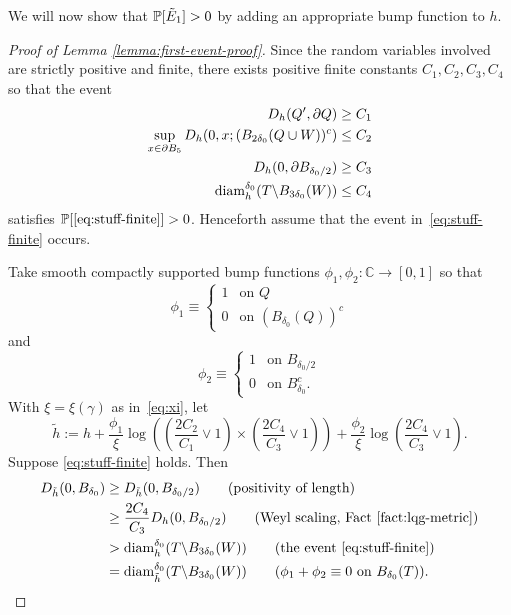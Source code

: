 \documentclass[12pt]{amsart}
\numberwithin{equation}{section}
\begin{document}
	
	We will now show that $\P[\tilde E_1] > 0$ by adding an appropriate bump function to $h$. 
	
	\begin{proof}[Proof of Lemma \ref{lemma:first-event-proof}]
		Since the random variables involved are strictly positive and finite, 
		there exists positive finite constants $C_1, C_2, C_3, C_4$ 
		so that the event
		\begin{equation} \label{eq:stuff-finite}
		\begin{aligned}
		D_h(Q', \partial Q) &\geq C_1 \\
		\sup_{x \in \partial B_{5}} D_h(0, x; (B_{2 \delta_0}(Q \cup W))^c) &\leq C_2 \\
		D_h(0, \partial B_{\delta_0/2}) &\geq C_3  \\
		\diam^{\delta_0}_h(T \backslash B_{3 \delta_0}(W)) &\leq C_4
		\end{aligned}
		\end{equation}
		satisfies	$\P[\eqref{eq:stuff-finite}] > 0$. Henceforth assume that the event in~\eqref{eq:stuff-finite} occurs.
		
		Take smooth compactly supported bump functions $\phi_1, \phi_2 : \mathbb C\to [0,1]$
		so that
		\[
		\phi_1 \equiv \begin{cases}
		1 &\mbox{on $Q$} \\
		0 &\mbox{on $(B_{\delta_0}(Q))^c$}
		\end{cases}
		\]
		and
		\[
		\phi_2 \equiv \begin{cases}
		1 &\mbox{on  $B_{\delta_0/2}$} \\
		0 &\mbox{on  $B_{\delta_0}^c$}.
		\end{cases}
		\]
		With $\xi = \xi(\gamma)$ as in~\eqref{eq:xi}, let
		\begin{equation}
		\tilde h := h + \frac{\phi_1}{\xi} \log\left( (\frac{2 C_2}{C_1} \vee 1) \times (\frac{2 C_4}{C_3} \vee 1)\right) + \frac{\phi_2}{\xi} \log\left(\frac{2 C_4}{C_3} \vee 1\right).
		\end{equation}
		Suppose \eqref{eq:stuff-finite} holds.
		Then 
		\begin{align} \label{eq:first-event-pf1}
		D_{\tilde h}(0, B_{\delta_0}) &\geq D_{\tilde h}(0, B_{\delta_0/2}) \qquad \mbox{(positivity of length)} \notag \\
		&\geq \frac{2 C_4}{C_3} D_{h}(0, B_{\delta_0/2}) \qquad \mbox{(Weyl scaling, Fact~\ref{fact:lqg-metric})}  \notag\\
		&> \diam^{\delta_0}_h(T \backslash B_{3 \delta_0}(W)) \qquad \mbox{(the event \eqref{eq:stuff-finite})}  \notag \\ 
		&= \diam^{\delta_0}_{\tilde h}(T \backslash B_{3 \delta_0}(W)) \qquad \mbox{($\phi_1 + \phi_2 \equiv 0$ on $B_{\delta_0}(T)$)}.
		\end{align}
		

\end{proof}
\end{document}
